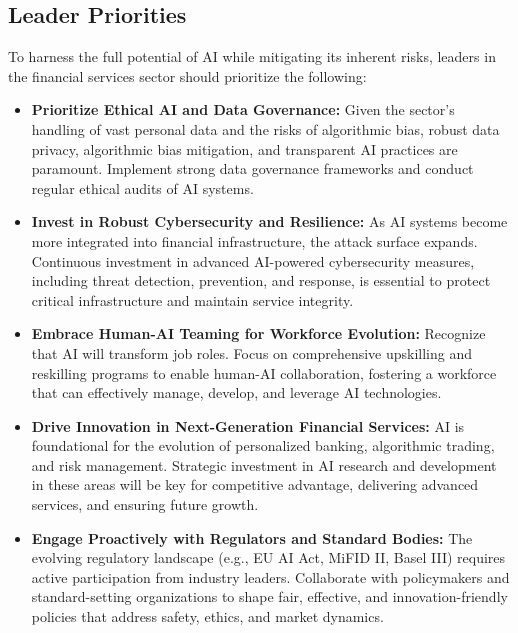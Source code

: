 \subsection{Leader Priorities}
To harness the full potential of AI while mitigating its inherent risks, leaders in the financial services sector should prioritize the following:
\begin{itemize}
    \item \textbf{Prioritize Ethical AI and Data Governance:} Given the sector's handling of vast personal data and the risks of algorithmic bias, robust data privacy, algorithmic bias mitigation, and transparent AI practices are paramount. Implement strong data governance frameworks and conduct regular ethical audits of AI systems.
    \item \textbf{Invest in Robust Cybersecurity and Resilience:} As AI systems become more integrated into financial infrastructure, the attack surface expands. Continuous investment in advanced AI-powered cybersecurity measures, including threat detection, prevention, and response, is essential to protect critical infrastructure and maintain service integrity.
    \item \textbf{Embrace Human-AI Teaming for Workforce Evolution:} Recognize that AI will transform job roles. Focus on comprehensive upskilling and reskilling programs to enable human-AI collaboration, fostering a workforce that can effectively manage, develop, and leverage AI technologies.
    \item \textbf{Drive Innovation in Next-Generation Financial Services:} AI is foundational for the evolution of personalized banking, algorithmic trading, and risk management. Strategic investment in AI research and development in these areas will be key for competitive advantage, delivering advanced services, and ensuring future growth.
    \item \textbf{Engage Proactively with Regulators and Standard Bodies:} The evolving regulatory landscape (e.g., EU AI Act, MiFID II, Basel III) requires active participation from industry leaders. Collaborate with policymakers and standard-setting organizations to shape fair, effective, and innovation-friendly policies that address safety, ethics, and market dynamics.
\end{itemize}

